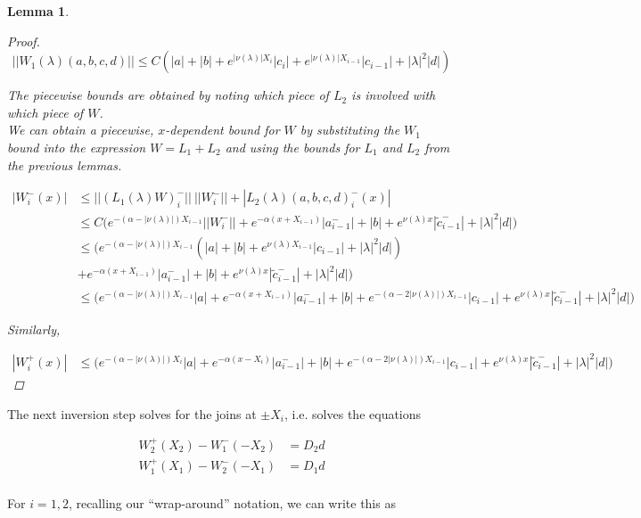 \documentclass[12pt]{article}
\newtheorem{lemma}{Lemma}
\begin{document}
\begin{lemma}
\begin{proof}
\[
||W_1(\lambda)(a,b,c,d)|| \leq C (|a| + |b| + e^{|\nu(\lambda)|X_i}|c_i| + e^{|\nu(\lambda)|X_{i-1}}|c_{i-1}| + |\lambda|^2 |d| )
\]

The piecewise bounds are obtained by noting which piece of $L_2$ is involved with which piece of $W$.\\

We can obtain a piecewise, $x$-dependent bound for $W$ by substituting the $W_1$ bound into the expression $W = L_1 + L_2$ and using the bounds for $L_1$ and $L_2$ from the previous lemmas.

\begin{align*}
|W_i^-(x)| &\leq ||(L_1(\lambda)W)_i^-||\:||W_i^-|| + |L_2(\lambda)(a,b,c,d)_i^-(x)| \\
&\leq C \Big( e^{-(\alpha -|\nu(\lambda)|)X_{i-1}} ||W_i^-|| + e^{-\alpha(x + X_{i-1})}|a_{i-1}^-| + |b| + e^{\nu(\lambda)x} |\tilde{c}_{i-1}^-| + |\lambda|^2 |d| \Big) \\
&\leq \Big( e^{-(\alpha -|\nu(\lambda)|)X_{i-1}} (|a| + |b| + e^{\nu(\lambda)X_{i-1}}|c_{i-1}| + |\lambda|^2 |d|) \\
&+ e^{-\alpha(x + X_{i-1})}|a_{i-1}^-| + |b| + e^{\nu(\lambda)x} |\tilde{c}_{i-1}^-| + |\lambda|^2 |d| \Big) \\
&\leq \Big( e^{-(\alpha -|\nu(\lambda)|)X_{i-1}} |a| + e^{-\alpha(x + X_{i-1})}|a_{i-1}^-| + |b| + e^{-(\alpha - 2|\nu(\lambda)|)X_{i-1}} |c_{i-1}| + e^{\nu(\lambda)x} |\tilde{c}_{i-1}^-| + |\lambda|^2 |d| \Big)
\end{align*}

Similarly, 

\begin{align*}
|W_i^+(x)| &\leq \Big( e^{-(\alpha -|\nu(\lambda)|)X_i} |a| + e^{-\alpha(x - X_i)}|a_{i-1}^-| + |b| + e^{-(\alpha - 2|\nu(\lambda)|)X_{i-1}} |c_{i-1}| + e^{\nu(\lambda)x} |\tilde{c}_{i-1}^-| + |\lambda|^2 |d| \Big)
\end{align*}

\end{proof}
\end{lemma}

The next inversion step solves for the joins at $\pm X_i$, i.e. solves the equations

\begin{align*}
W_2^+(X_2) - W_1^-(-X_2) &= D_2 d \\
W_1^+(X_1) - W_2^-(-X_1) &= D_1 d \\
\end{align*}

For $i = 1, 2$, recalling our ``wrap-around'' notation, we can write this as
\end{document}
